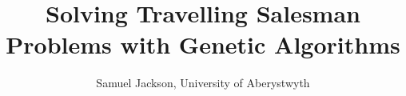 \documentclass[journal]{IEEEtran}
\begin{document}
%
\title{Solving Travelling Salesman Problems with Genetic Algorithms}
%
%
%

\author{Samuel Jackson, University of Aberystwyth}

% 
%



% 




\end{document}
